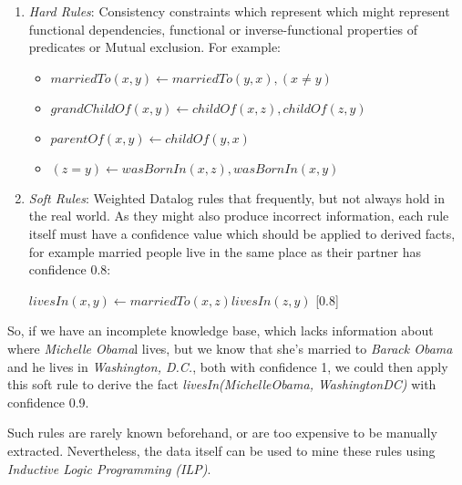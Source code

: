 \begin{enumerate}

 \item \emph{Hard Rules}: Consistency constraints which represent which might represent functional dependencies, functional or inverse-functional properties of predicates or Mutual exclusion. For example:
    \begin{itemize}
      \item \begin{math} marriedTo(x,y) \leftarrow marriedTo(y,x),(x \neq y)\end{math}
      \item \begin{math} grandChildOf(x,y) \leftarrow childOf(x,z),childOf(z,y)\end{math}
      \item \begin{math} parentOf(x,y) \leftarrow childOf(y,x)\end{math}
      \item \begin{math} (z=y) \leftarrow wasBornIn(x,z),wasBornIn(x,y)\end{math}
    \end{itemize}

 \item \emph{Soft Rules}: Weighted Datalog rules that frequently, but not always hold in the real world. As they might also produce incorrect information, each rule itself must have a confidence value which should be applied to derived facts, for example married people live in the same place as their partner has confidence 0.8:
    \begin{center}
      \begin{math} livesIn(x,y) \leftarrow marriedTo(x,z)livesIn(z,y)\end{math} [0.8]
    \end{center}
\end{enumerate}

So, if we have an incomplete knowledge base, which lacks information about where \emph{Michelle Obama}l lives, but we know that she's married to \emph{Barack Obama} and he lives in \emph{Washington, D.C.}, both with confidence 1, we could then apply this soft rule to derive the fact \emph{livesIn(MichelleObama, WashingtonDC)} with confidence 0.9.

Such rules are rarely known beforehand, or are too expensive to be manually extracted. Nevertheless, the data itself can be used to mine these rules using \emph{Inductive Logic Programming (ILP)}. 

